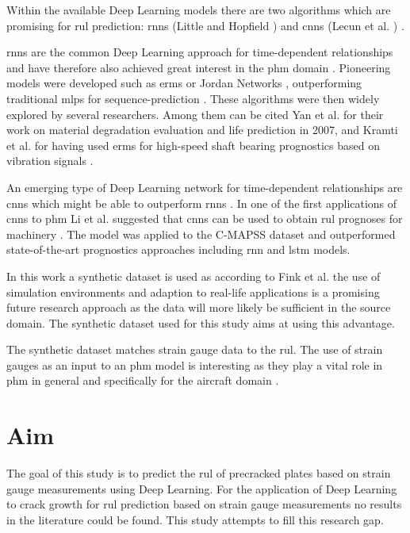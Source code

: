 \documentclass[conference]{IEEEtran}
\begin{document}
Within the available Deep Learning models there are two algorithms which are promising for \gls{rul} prediction: \glspl{rnn} (Little \cite{Little1996} and Hopfield  \cite{Hopfield1982}) and \glspl{cnn} (Lecun et al. \cite{Lecun1998}) \cite{Akrim2021}.

\glspl{rnn} are the common Deep Learning approach for time-dependent relationships and have therefore also achieved great interest in the \gls{phm} domain \cite{Akrim2021}. Pioneering models were developed such as \glspl{erm} \cite{Elman1990} or Jordan Networks \cite{Jordan1997}, outperforming traditional \glspl{mlp} for sequence-prediction \cite{Akrim2021}. These algorithms were then widely explored by several researchers. Among them can be cited Yan et al. \cite{Yan2007} for their work on material degradation evaluation and life prediction in 2007, and Kramti et al. \cite{Kramti2018} for having used \glspl{erm} for high-speed shaft bearing prognostics based on vibration signals \cite{Akrim2021}.

An emerging type of Deep Learning network for time-dependent relationships are \glspl{cnn} which might be able to outperform \glspl{rnn} \cite{Bai2018}. In one of the first applications of \glspl{cnn} to \gls{phm} Li et al. suggested that \glspl{cnn} can be used to obtain \gls{rul} prognoses for machinery \cite{Li2018}. The model was applied to the C-MAPSS dataset \cite{Saxena2008} and outperformed state-of-the-art prognostics approaches including \gls{rnn} and \gls{lstm} models.

In this work a synthetic dataset is used as according to Fink et al. \cite{Fink2020} the use of simulation environments and adaption to real-life applications is a promising future research approach as the data will more likely be sufficient in the source domain. The synthetic dataset used for this study aims at using this advantage.

The synthetic dataset matches strain gauge data to the \gls{rul}. The use of strain gauges as an input to an \gls{phm} model is interesting as they play a vital role in \gls{phm} in general \cite{Tinga2019} and specifically for the aircraft domain \cite{Timothy2009}.

\section{Aim}
\label{sec:aim}

The goal of this study is to predict the \gls{rul} of precracked plates based on strain gauge measurements using Deep Learning. 
For the application of Deep Learning to crack growth for \gls{rul} prediction based on strain gauge measurements no results in the literature could be found. This study attempts to fill this research gap.
\end{document}
